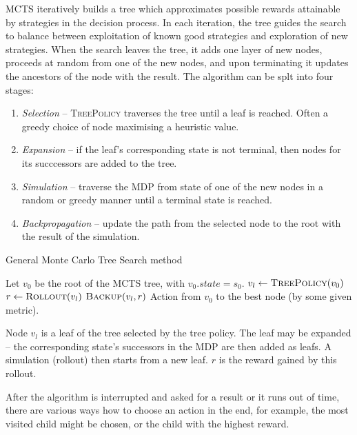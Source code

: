 MCTS iteratively builds a tree which approximates possible rewards
attainable by strategies in the decision process. In each iteration, the
tree guides the search to balance between exploitation of known good
strategies and exploration of new strategies. When the search leaves the
tree, it adds one layer of new nodes, proceeds at random from one of the
new nodes, and upon terminating it updates the ancestors of the node
with the result. The algorithm can be splt into four stages:

\begin{enumerate}
    \item {\em Selection} -- \textsc{TreePolicy} traverses the tree
        until a leaf is reached. Often a greedy choice of node
        maximising a heuristic value.
    \item {\em Expansion} -- if the leaf's corresponding state is not
        terminal, then nodes for its succcessors are added to the tree.
    \item {\em Simulation} -- traverse the MDP from state of one of the new
        nodes in a random or greedy manner until a terminal state is reached.
    \item {\em Backpropagation} -- update the path from the selected
        node to the root with the result of the simulation.
\end{enumerate}


\begin{algorithm}
\caption{General Monte Carlo Tree Search method}
\label{mcts}
\begin{algorithmic}
    \State Let $v_0$ be the root of the MCTS tree, with $v_0.state = s_0$.
        \State $v_l \gets \Call{TreePolicy}{v_0}$
        \State $r \gets \Call{Rollout}{v_l}$
        \State $\Call{Backup}{v_l, r}$
    \EndWhile
    \State \Return Action from $v_0$ to the best node (by some
    given metric).
\EndFunction
\end{algorithmic}
\end{algorithm}

Node $v_l$ is a leaf of the tree selected by the tree policy.
The leaf may be expanded -- the corresponding state's successors in the
MDP are then added as leafs.
A simulation (rollout) then starts from a new leaf.
$r$ is the reward gained by this rollout.

After the algorithm is interrupted and asked for a result or it runs out
of time, there are various ways how to
choose an action in the end, for example, the most visited child might
be chosen, or the child with the highest reward.


